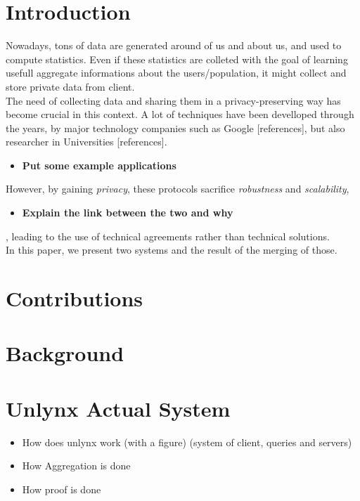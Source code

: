 \documentclass{article}
\begin{document}
\section*{Introduction}
Nowadays, tons of data are generated around of us and about us, and used to compute statistics.  Even if these statistics are colleted with the goal of learning usefull aggregate informations about the users/population, it might collect and store private data from client.\\
The need of collecting data and sharing them in a privacy-preserving way has become crucial in this context. A lot of techniques have been develloped through the years, by major technology companies such as Google [references], but also researcher in Universities [references].\\
\begin{itemize}
\item \textbf{Put some example applications}\\
\end{itemize}
However, by gaining \textit{privacy}, these protocols sacrifice \textit{robustness} and \textit{scalability},\\
\begin{itemize}
\item \textbf{Explain the link between the two and why}
\end{itemize}
, leading to the use of technical agreements rather than technical solutions.\\
In this paper, we present two systems and the result of the merging of those.

\section*{Contributions}
\section*{Background}

\section{Unlynx Actual System}
\begin{itemize}
\item How does unlynx work (with a figure) (system of client, queries and servers)
\item How Aggregation is done
\item How proof is done
\end{itemize}
\end{document}
